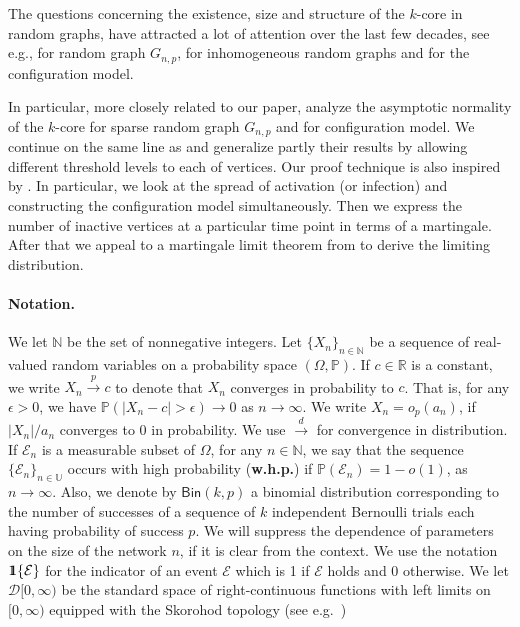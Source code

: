 \documentclass[11pt]{article}
\def\NN{\mathbb{N}}
\def\ind{{\rm 1\hspace{-0.90ex}1}}
\newcommand{\Bin}{\mathsf{Bin}}
\def\tod{\stackrel{d}{\longrightarrow}}
\newcommand{\cE}{\mathcal{E}}
\newcommand{\cD}{\mathcal{D}}
\newcommand{\iI}{\mathcal{I}}
\def\tod{\stackrel{d}{\longrightarrow}}
\begin{document}
The questions concerning the existence, size and structure of the $k$-core in random graphs, have attracted a lot of attention over the last few decades, see e.g., \cite{pittel1996sudden, luczak1991size} for random graph $G_{n,p}$, \cite{bayraktar2020k, riordan2008k} for inhomogeneous random graphs and  \cite{janson2007simple, molloy2005cores, cooper2004cores, janson2008asymptotic, fernholz2004cores} for the configuration model.

In particular, more closely related to our paper, \cite{janson2008asymptotic}  analyze the asymptotic normality of the $k$-core  for sparse random graph $G_{n,p}$ and for configuration model.  We continue on the same line as \cite{janson2008asymptotic} and generalize partly their results by allowing different threshold levels to each of vertices. Our proof technique is also inspired by \cite{janson2008asymptotic}. In particular, we look at the spread of activation (or infection) and constructing the configuration model simultaneously. Then we express the number of inactive vertices at a particular time point in terms of a martingale. After that we appeal to a martingale limit theorem from \cite{jacod2013limit} to derive the limiting distribution.



\paragraph{Notation.} We let $\NN$ be the set of nonnegative integers. 
Let $\{ X_n \}_{n \in \NN}$ be a sequence of real-valued random variables on a probability space
$ (\Omega, \mathbb{P})$. 
If $c \in \mathbb{R}$ is a constant, we write $X_n \stackrel{p}{\longrightarrow} c$ to denote that $X_n$ converges in probability to $c$.
That is, for any $\epsilon >0$, we have $\mathbb{P} (|X_n - c|>\epsilon) \rightarrow 0$ as $n \rightarrow \infty$.
We write $X_n = o_{p} (a_n)$, if $|X_n|/a_n$ converges to 0 in probability. We use $\tod$ for convergence in distribution.
If $\mathcal{E}_n$ is a measurable subset of $\Omega$, for any $n \in \NN$, we say that the sequence
$\{ \mathcal{E}_n \}_{n \in \mathbb{U}}$ occurs with high probability ({\bf w.h.p.}) if $\mathbb{P} (\mathcal{E}_n) = 1-o(1)$, as
$n\rightarrow \infty$.
Also, we denote by 
$\Bin (k,p)$ a binomial  distribution  corresponding to the number of
successes of a sequence of $k$ independent Bernoulli trials each having probability of success  $p$.
We will suppress the dependence of parameters on the size of the network $n$, if it is clear from the context. We use the notation $\ind{\{\cE\}}$ for the indicator of an event $\cE$ which is 1 if $\cE$ holds and 0 otherwise. We let $\cD[0,\infty)$ be the standard space of right-continuous functions with left limits on $[0,\infty)$ equipped with the Skorohod topology (see e.g.~\cite{jacod2013limit, kallenberg1997foundations})
\end{document}

